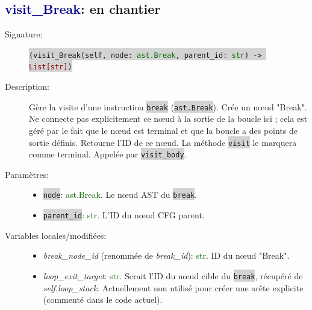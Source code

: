 \documentclass[11pt,a4paper]{article}
\newcommand{\code}[1]{\colorbox{lightgray}{\texttt{\small #1}}}
\newcommand{\var}[1]{\textit{#1}}
\newcommand{\vartype}[1]{\textcolor{darkgreen}{#1}}
\newcommand{\methodname}[1]{\textbf{\textcolor{darkblue}{#1}}}
\newcommand{\param}[1]{\code{#1}}
\newcommand{\rettype}[1]{\textcolor{darkred}{#1}}
\begin{document}
\subsection*{\methodname{visit\_Break}: en chantier}
\begin{description}
    \item[Signature:] \code{(visit\_Break(self, node: \vartype{ast.Break}, parent\_id: \vartype{str}) -> \rettype{List[str]})}
    \item[Description:] Gère la visite d'une instruction \code{break} (\code{ast.Break}). Crée un nœud "Break". Ne connecte pas explicitement ce nœud à la sortie de la boucle ici ; cela est géré par le fait que le nœud est terminal et que la boucle a des points de sortie définis. Retourne l'ID de ce nœud. La méthode \code{visit} le marquera comme terminal. Appelée par \code{visit\_body}.
    \item[Paramètres:]
    \begin{itemize}
        \item \param{node}: \vartype{ast.Break}. Le nœud AST du \code{break}.
        \item \param{parent\_id}: \vartype{str}. L'ID du nœud CFG parent.
    \end{itemize}
    \item[Variables locales/modifiées:]
    \begin{itemize}
        \item \var{break\_node\_id} (renommée de \var{break\_id}): \vartype{str}. ID du nœud "Break".
        \item \var{loop\_exit\_target}: \vartype{str}. Serait l'ID du nœud cible du \code{break}, récupéré de \var{self.loop\_stack}. Actuellement non utilisé pour créer une arête explicite (commenté dans le code actuel).
    \end{itemize}
\end{description}
\end{document}
